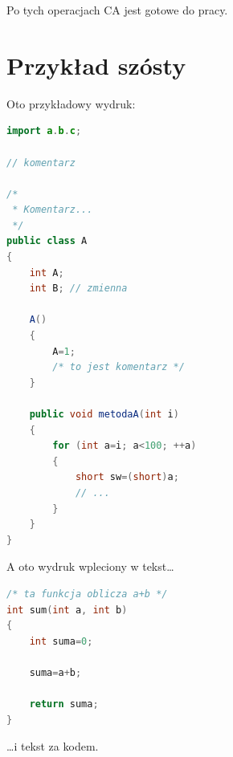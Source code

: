 Po tych operacjach CA jest gotowe do pracy.

\section{Przykład szósty}

Oto przykładowy wydruk:
\begin{lstlisting}[language=Java,style=outcode,caption=Przykładowy wydruk]
import a.b.c;

// komentarz

/*
 * Komentarz...
 */
public class A
{
	int A;
	int B; // zmienna

	A()
	{
		A=1;
		/* to jest komentarz */
	}

	public void metodaA(int i)
	{
		for (int a=i; a<100; ++a)
		{
			short sw=(short)a;
			// ...
		}
	}
}
\end{lstlisting}

A oto wydruk wpleciony w tekst\dots
\begin{lstlisting}[language=C,style=incode]
/* ta funkcja oblicza a+b */
int sum(int a, int b)
{
	int suma=0;

	suma=a+b;

	return suma;
}
\end{lstlisting}
\dots i tekst za kodem.

% 

